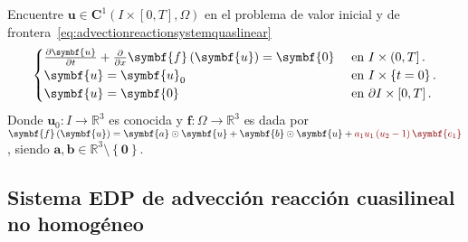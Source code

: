 Encuentre
\begin{math}
	\symbf{u}\in
	\symbf{C}^{1}\left(I\times\left[0,T\right],\Omega\right)
\end{math}
en el problema de valor inicial y de frontera~\eqref{eq:advectionreactionsystemquaslinear}
\begin{equation}\label{eq:advectionreactionsystemquaslinear}
	\begin{cases}
		\diffp{\symbf{u}}{t}+\diffp{}{x}\symbf{f}\left(\symbf{u}\right)=
		\symbf{0}     & \text{ en }I\times\left(0,T\right].          \\
		\symbf{u}                                                      =
		\symbf{u}_{0} & \text{ en }I\times\left\{t=0\right\}.        \\
		\symbf{u}                                                      =
		\symbf{0}     & \text{ en }\partial I\times\left[0,T\right].
	\end{cases}
\end{equation}
Donde
\begin{math}
	\symbf{u}_{0}\colon I\to
	\mathbb{R}^{3}
\end{math}
es conocida y
\begin{math}
	\symbf{f}\colon\Omega\to
	\mathbb{R}^{3}
\end{math}
es dada por
\begin{math}
	\symbf{f}\left(\symbf{u}\right)=
	\symbf{a}\odot\symbf{u}+
	\symbf{b}\odot\symbf{u}+
	\mathcolor{DarkRed}{a_{1}u_{1}\left(u_{2}-1\right)\symbf{e_{1}}}
\end{math},
siendo $\symbf{a},\symbf{b}\in\mathbb{R}^{3}\setminus\left\{\symbf{0}\right\}$.

\subsection*{Sistema EDP de advección reacción cuasilineal no homogéneo}

